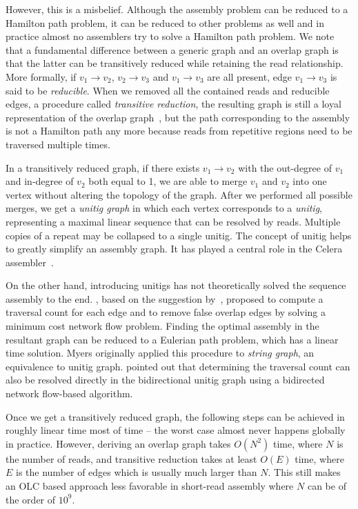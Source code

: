 \documentclass{bioinfo}
\begin{document}
\begin{methods}
However, this is a misbelief. Although the assembly problem can be reduced to a
Hamilton path problem, it can be reduced to other problems as well and in
practice almost no assemblers try to solve a Hamilton path problem.  We note
that a fundamental difference between a generic graph and an overlap graph is
that the latter can be transitively reduced while retaining the read
relationship. More formally, if $v_1\to v_2$, $v_2\to v_3$ and $v_1\to v_3$ are
all present, edge $v_1\to v_3$ is said to be \emph{reducible}. When we removed
all the contained reads and reducible edges, a procedure called
\emph{transitive reduction}, the resulting graph is still a loyal
representation of the overlap graph~\citep{Myers:1995nx}, but the path
corresponding to the assembly is not a Hamilton path any more because reads
from repetitive regions need to be traversed multiple times.

In a transitively reduced graph, if there exists $v_1\to v_2$ with the
out-degree of $v_1$ and in-degree of $v_2$ both equal to 1, we are able to
merge $v_1$ and $v_2$ into one vertex without altering the topology of the
graph. After we performed all possible merges, we get a \emph{unitig graph} in
which each vertex corresponds to a \emph{unitig}, representing a maximal linear
sequence that can be resolved by reads. Multiple copies of a repeat may be
collapsed to a single unitig. The concept of unitig helps to greatly simplify
an assembly graph. It has played a central role in the Celera
assembler~\citep{Myers:2000kl}.

On the other hand, introducing unitigs has not theoretically solved the
sequence assembly to the end. \citet{Myers:2005bh}, based on the suggestion
by~\citet{Pevzner:2001vn}, proposed to compute a traversal count for each edge
and to remove false overlap edges by solving a minimum cost network flow
problem. Finding the optimal assembly in the resultant graph can be reduced to
a Eulerian path problem, which has a linear time solution. Myers originally
applied this procedure to \emph{string graph}, an equivalence to unitig graph.
\citet{Medvedev:2009ve} pointed out that determining the traversal count can
also be resolved directly in the bidirectional unitig graph using a bidirected
network flow-based algorithm.

Once we get a transitively reduced graph, the following steps can be achieved
in roughly linear time most of time -- the worst case almost never happens
globally in practice. However, deriving an overlap graph takes $O(N^2)$ time,
where $N$ is the number of reads, and transitive reduction takes at least
$O(E)$ time, where $E$ is the number of edges which is usually much larger than
$N$. This still makes an OLC based approach less favorable in short-read
assembly where $N$ can be of the order of $10^9$.


\end{methods}
\end{document}

